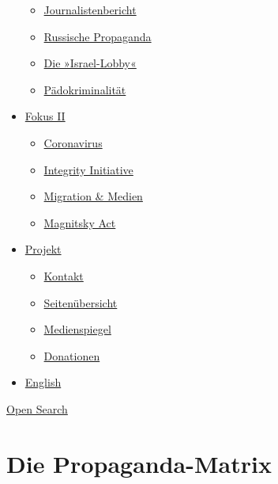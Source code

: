 \begin{itemize}
  \begin{itemize}
  \tightlist
  \item
    \href{https://swprs.org/bericht-eines-journalisten/}{Journalistenbericht}
  \item
    \href{https://swprs.org/russische-propaganda/}{Russische Propaganda}
  \item
    \href{https://swprs.org/die-israel-lobby-fakten-und-mythen/}{Die
    »Israel-Lobby«}
  \item
    \href{https://swprs.org/geopolitik-und-paedokriminalitaet/}{Pädokriminalität}
  \end{itemize}
\item
  \href{https://swprs.org/migration-und-medien/}{Fokus II}

  \begin{itemize}
  \tightlist
  \item
    \href{https://swprs.org/covid-19-hinweis-ii/}{Coronavirus}
  \item
    \href{https://swprs.org/die-integrity-initiative/}{Integrity
    Initiative}
  \item
    \href{https://swprs.org/migration-und-medien/}{Migration \& Medien}
  \item
    \href{https://swprs.org/der-fall-magnitsky/}{Magnitsky Act}
  \end{itemize}
\item
  \href{https://swprs.org/kontakt/}{Projekt}

  \begin{itemize}
  \tightlist
  \item
    \href{https://swprs.org/kontakt/}{Kontakt}
  \item
    \href{https://swprs.org/uebersicht/}{Seitenübersicht}
  \item
    \href{https://swprs.org/medienspiegel/}{Medienspiegel}
  \item
    \href{https://swprs.org/donationen/}{Donationen}
  \end{itemize}
\item
  \href{https://swprs.org/contact/}{English}
\end{itemize}

\protect\hyperlink{}{Open Search}

\hypertarget{die-propaganda-matrix}{%
\section{Die Propaganda-Matrix}\label{die-propaganda-matrix}}

